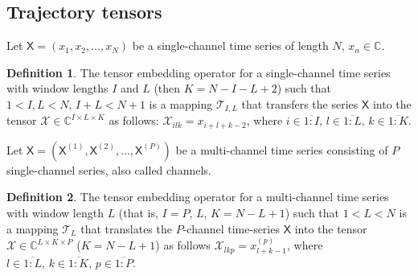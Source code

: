 \documentclass[12pt]{article}
\newcommand{\tX}{\mathsf{X}}
\newcommand{\calX}{\mathcal{X}}
\newcommand{\calT}{\mathcal{T}}
\theoremstyle{definition}
\newtheorem{definition}{Definition}
\begin{document}
\subsection{Trajectory tensors}
Let $\tX = (x_1, x_2, \ldots, x_N)$ be a single-channel time series
of length $N$, $x_n \in \mathbb{C}$.
\begin{definition}
  The tensor embedding operator for a single-channel time series with
  window lengths $I$ and $L$ (then $K=N-I-L+2$) such that ${1< I,L < N},\, {I + L < N + 1}$
  is a mapping $\calT_{I,L}$ that transfers the series
  $\tX$ into the tensor $\calX \in \mathbb{C}^{I\times L \times K}$
  as follows: ${\mathcal{X}_{ilk}=x_{i+l+k-2}}$, where
  $i\in \overline{1:I},\, l \in\overline{1:L},\, k \in\overline{1:K}$.
\end{definition}

Let $\tX = (\tX^{(1)}, \tX^{(2)}, \ldots, \tX^{(P)})$ be a multi-channel
time series consisting of $P$ single-channel series, also called channels.
\begin{definition}
  The tensor embedding operator for a multi-channel time series with
  window length $L$ (that is, $I=P$, $L$, $K=N-L+1$) such that ${1< L < N}$ is a mapping $\calT_{L}$
  that translates the
  $P$-channel time-series $\tX$ into the tensor $\calX \in
  \mathbb{C}^{L\times K \times P}$ (${K = N - L + 1}$) as follows
  $\mathcal{X}_{lkp} =  x_{l+k-1}^{(p)}$, where ${l \in
  \overline{1:L}},\, {k \in \overline{1:K}},\, {p \in \overline{1:P}}$.
\end{definition}
\end{document}
